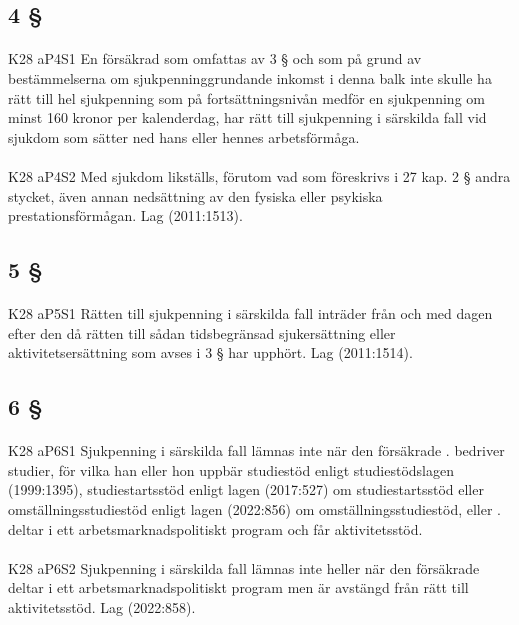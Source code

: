 \documentclass[a4paper,notitlepage,openany,10pt]{book}
\begin{document}
\subsection*{4 §}
\paragraph*{}
{\tiny K28 aP4S1}
En försäkrad som omfattas av 3 § och som på grund av bestämmelserna om sjukpenninggrundande inkomst i denna balk inte skulle ha rätt till hel sjukpenning som på fortsättningsnivån medför en sjukpenning om minst 160 kronor per kalenderdag, har rätt till sjukpenning i särskilda fall vid sjukdom som sätter ned hans eller hennes arbetsförmåga.
\paragraph*{}
{\tiny K28 aP4S2}
Med sjukdom likställs, förutom vad som föreskrivs i 27 kap. 2 § andra stycket, även annan nedsättning av den fysiska eller psykiska prestationsförmågan.
Lag (2011:1513).
\subsection*{5 §}
\paragraph*{}
{\tiny K28 aP5S1}
Rätten till sjukpenning i särskilda fall inträder från och med dagen efter den då rätten till sådan tidsbegränsad sjukersättning eller aktivitetsersättning som avses i 3 § har upphört.
Lag (2011:1514).
\subsection*{6 §}
\paragraph*{}
{\tiny K28 aP6S1}
Sjukpenning i särskilda fall lämnas inte när den försäkrade
. bedriver studier, för vilka han eller hon uppbär studiestöd enligt studiestödslagen (1999:1395), studiestartsstöd enligt lagen (2017:527) om studiestartsstöd eller omställningsstudiestöd enligt lagen (2022:856) om omställningsstudiestöd, eller
. deltar i ett arbetsmarknadspolitiskt program och får aktivitetsstöd.
\paragraph*{}
{\tiny K28 aP6S2}
Sjukpenning i särskilda fall lämnas inte heller när den försäkrade deltar i ett arbetsmarknadspolitiskt program men är avstängd från rätt till aktivitetsstöd.
Lag (2022:858).
\end{document}
